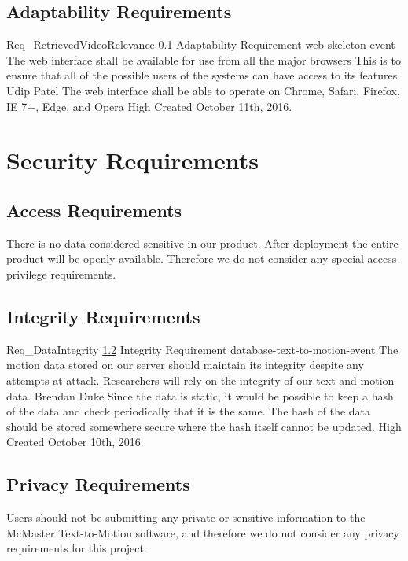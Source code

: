 \documentclass{scrreprt}
\begin{document}
\subsection{Adaptability Requirements}
\label{req-adaptability}

\requirement
{Req_RetrievedVideoRelevance}
{\ref{req-adaptability} Adaptability Requirement}
{web-skeleton-event}
{The web interface shall be available for use from all the major browsers}
{This is to ensure that all of the possible users of the systems can have access to its features}
{Udip Patel}
{The web interface shall be able to operate on Chrome, Safari, Firefox, IE 7+, Edge, and Opera}
{High}
{Created October 11th, 2016.}


\section{Security Requirements}

\subsection{Access Requirements}

There is no data considered sensitive in our product. After deployment the
entire product will be openly available. Therefore we do not consider any
special access-privilege requirements.

\subsection{Integrity Requirements}
\label{req-integrity}

\requirement
{Req_DataIntegrity}
{\ref{req-integrity} Integrity Requirement}
{database-text-to-motion-event}
{The motion data stored on our server should maintain its integrity despite any
attempts at attack.}
{Researchers will rely on the integrity of our text and motion data.}
{Brendan Duke}
{Since the data is static, it would be possible to keep a hash of the data and
check periodically that it is the same. The hash of the data should be stored
somewhere secure where the hash itself cannot be updated.}
{High}
{Created October 10th, 2016.}

\subsection{Privacy Requirements}

Users should not be submitting any private or sensitive information to the
McMaster Text-to-Motion software, and therefore we do not consider any privacy
requirements for this project.
\end{document}
